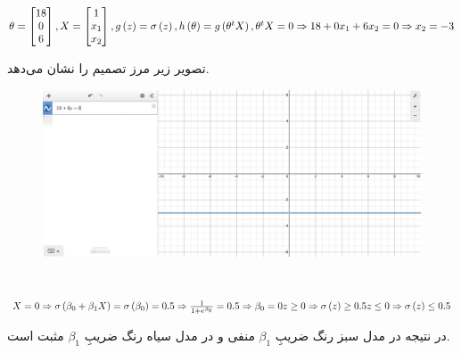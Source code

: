 \documentclass{article}
\begin{document}
\subsection{}
\begin{latin}
$
\theta = \begin{bmatrix}
18 \\
0 \\
6
\end{bmatrix}, \\
X = \begin{bmatrix}
1 \\
x_1\\
x_2
\end{bmatrix}, \\
g\left( z \right) = \sigma \left( z \right), \\
h\left( \theta \right) = g\left( \theta ^ t X \right),\\
\theta ^ t X = 0 \Rightarrow \\
18 + 0x_1 + 6x_2 = 0 \Rightarrow \\
x_2 = -3
$
\end{latin}
تصویر زیر مرز تصمیم را نشان می‌دهد.
\begin{figure}[H]
    \centering
    \includegraphics[width=1\textwidth]{figures/5.2.jpg}
    \caption
	{}
    \label{fig:fig2}
\end{figure}


\section{}%
\begin{latin}
$
X = 0 \Rightarrow \sigma\left( \beta_0 + \beta_1 X \right) = \sigma\left( \beta_0 \right) = 0.5 \\ \Rightarrow \frac{1}{1 + e ^ {\beta_0}} = 0.5 \\
\Rightarrow \beta_0 = 0 \\ \\
z \ge 0\Rightarrow  \sigma\left( z \right) \ge 0.5 \\
z \le 0\Rightarrow  \sigma\left( z \right) \le 0.5 \\
$
\end{latin}
در نتیجه در مدل سبز رنگ ضریبِ $\beta_1$ منفی و در مدل سیاه رنگ ضریبِ $\beta_1$ مثبت است.
\end{document}
